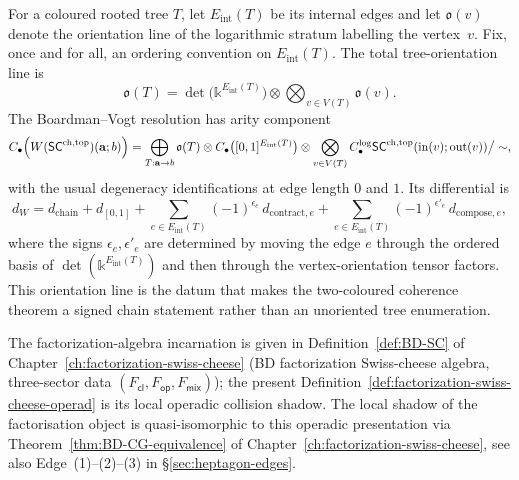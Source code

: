 \begin{definition}
For a coloured rooted tree \(T\), let \(E_{\mathrm{int}}(T)\) be its
internal edges and let \(\mathfrak{o}(v)\) denote the orientation line
of the logarithmic stratum labelling the vertex~\(v\). Fix, once and
for all, an ordering convention on \(E_{\mathrm{int}}(T)\). The total
tree-orientation line is
\[
\mathfrak{o}(T)
=
\det\bigl(\mathbb{k}^{E_{\mathrm{int}}(T)}\bigr)
\otimes
\bigotimes_{v\in V(T)}\mathfrak{o}(v).
\]
The Boardman--Vogt resolution has
arity component
\[
C_\bullet\!\left(W(\mathsf{SC}^{\mathrm{ch},\mathrm{top}})(\mathbf a;b)\right)
=
\bigoplus_{T:\mathbf a\to b}
\mathfrak{o}(T)\otimes
C_\bullet\bigl([0,1]^{E_{\mathrm{int}}(T)}\bigr)
\otimes
\bigotimes_{v\in V(T)}
C_\bullet^{\log}\mathsf{SC}^{\mathrm{ch},\mathrm{top}}(\mathrm{in}(v);\mathrm{out}(v))
\big/ \sim,
\]
with the usual degeneracy identifications at edge length \(0\) and
\(1\). Its differential is
\[
d_W=d_{\mathrm{chain}}+d_{[0,1]}
+\sum_{e\in E_{\mathrm{int}}(T)}(-1)^{\epsilon_e}\,
d_{\mathrm{contract},e}
+\sum_{e\in E_{\mathrm{int}}(T)}(-1)^{\epsilon'_e}\,
d_{\mathrm{compose},e},
\]
where the signs \(\epsilon_e,\epsilon'_e\) are determined by moving
the edge \(e\) through the ordered basis of
\(\det(\mathbb{k}^{E_{\mathrm{int}}(T)})\) and then through the
vertex-orientation tensor factors. This orientation line is the datum
that makes the two-coloured coherence theorem a signed chain statement
rather than an unoriented tree enumeration.
\end{definition}

\begin{remark}
\label{rem:def-fsc-pointer}
The factorization-algebra incarnation is given in
Definition~\ref{def:BD-SC} of
Chapter~\ref{ch:factorization-swiss-cheese} (BD factorization
Swiss-cheese algebra, three-sector data $(F_{\mathsf{cl}},
F_{\mathsf{op}},F_{\mathsf{mix}})$); the present
Definition~\ref{def:factorization-swiss-cheese-operad} is its local
operadic collision shadow. The local shadow of the factorisation
object is quasi-isomorphic to this operadic presentation via
Theorem~\ref{thm:BD-CG-equivalence} of
Chapter~\ref{ch:factorization-swiss-cheese}, see also
Edge~(1)--(2)--(3) in \S\ref{sec:heptagon-edges}.
\end{remark}

